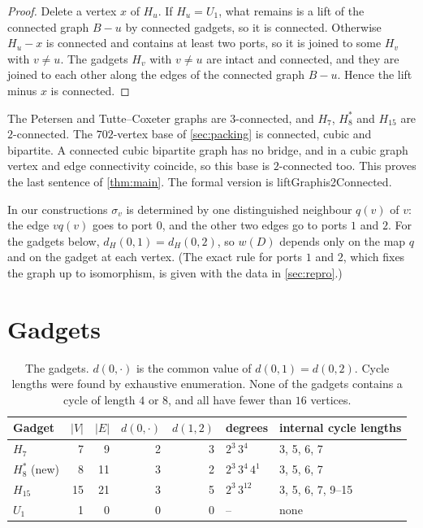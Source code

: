 \documentclass[11pt]{amsart}
\theoremstyle{definition}
\theoremstyle{remark}
\newcommand{\Hseven}{H_7}
\newcommand{\Hfifteen}{H_{15}}
\newcommand{\Height}{H_8^{*}}
\newcommand{\leanus}{\textunderscore\allowbreak}
\newcommand{\lean}[1]{{\ttfamily\let\_\leanus #1}}
\begin{document}
\begin{proof}
Delete a vertex $x$ of $H_u$. If $H_u=U_1$, what remains is a lift of the
connected graph $B-u$ by connected gadgets, so it is connected. Otherwise
$H_u-x$ is connected and contains at least two ports, so it is joined to some
$H_v$ with $v\ne u$. The gadgets $H_v$ with $v\ne u$ are intact and connected,
and they are joined to each other along the edges of the connected graph $B-u$.
Hence the lift minus $x$ is connected.
\end{proof}

The Petersen and Tutte--Coxeter graphs are $3$-connected, and $\Hseven$,
$\Height$ and $\Hfifteen$ are $2$-connected. The $702$-vertex base of
\cref{sec:packing} is connected, cubic and bipartite. A connected cubic
bipartite graph has no bridge, and in a cubic graph vertex and edge
connectivity coincide, so this base is $2$-connected too. This proves the last
sentence of \cref{thm:main}. The formal version is
\lean{liftGraph\_is2Connected}.

In our constructions $\sigma_v$ is determined by one distinguished neighbour
$q(v)$ of $v$: the edge $vq(v)$ goes to port $0$, and the other two edges go to
ports $1$ and $2$. For the gadgets below, $d_H(0,1)=d_H(0,2)$, so $w(D)$
depends only on the map $q$ and on the gadget at each vertex. (The exact rule
for ports $1$ and $2$, which fixes the graph up to isomorphism, is given with
the data in \cref{sec:repro}.)

\section{Gadgets}\label{sec:gadgets}

\begin{table}[ht]
\centering
\caption{The gadgets. $d(0,\cdot)$ is the common value of $d(0,1)=d(0,2)$.
Cycle lengths were found by exhaustive enumeration. None of the gadgets
contains a cycle of length $4$ or $8$, and all have fewer than $16$ vertices.}
\label{tab:gadgets}
\begin{tabular}{@{}lrrrrll@{}}
\toprule
Gadget & $|V|$ & $|E|$ & $d(0,\cdot)$ & $d(1,2)$ & degrees & internal cycle lengths\\
\midrule
$\Hseven$ \cite{Garcia2026}   & 7  & 9  & 2 & 3 & $2^3\,3^4$ & 3, 5, 6, 7\\
$\Height$ (new)               & 8  & 11 & 3 & 2 & $2^3\,3^4\,4^1$ & 3, 5, 6, 7\\
$\Hfifteen$ \cite{Garcia2026} & 15 & 21 & 3 & 5 & $2^3\,3^{12}$ & 3, 5, 6, 7, 9--15\\
$U_1$                         & 1  & 0  & 0 & 0 & -- & none\\
\bottomrule
\end{tabular}
\end{table}
\end{document}

